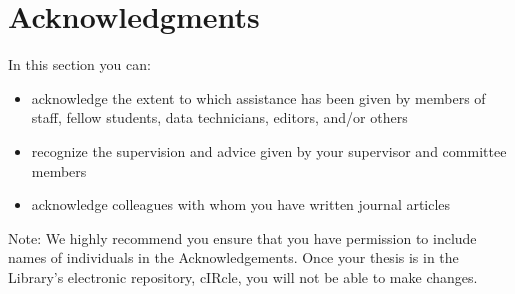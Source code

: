 \chapter{Acknowledgments}

In this section you can:

\begin{itemize}
  \item acknowledge the extent to which assistance has been given by members of staff, fellow students, data technicians, editors, and/or others
  \item recognize the supervision and advice given by your supervisor and committee members
  \item acknowledge colleagues with whom you have written journal articles
\end{itemize}

Note: We highly recommend you ensure that you have permission to include names of individuals in the Acknowledgements. Once your thesis is in the Library's electronic repository, cIRcle, you will not be able to make changes.
